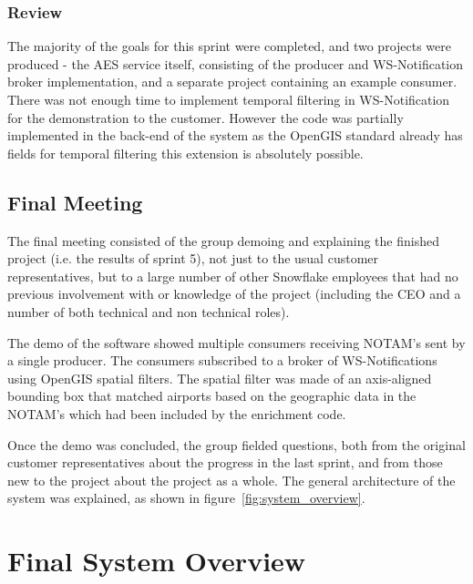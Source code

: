 \documentclass[a4paper, 12pt, twoside]{article}
\begin{document}
\subsubsection{Review}

The majority of the goals for this sprint were completed, and two projects were produced - the AES service itself, consisting of the producer and WS-Notification broker implementation, and a separate project containing an example consumer. There was not enough time to implement temporal filtering in WS-Notification for the demonstration to the customer. However the code was partially implemented in the back-end of the system as the OpenGIS standard already has fields for temporal filtering this extension is absolutely possible. 

\subsection{Final Meeting}
\label{sec:impl_final_meeting}

The final meeting consisted of the group demoing and explaining the finished project (i.e. the results of sprint 5), not just to the usual customer representatives, but to a large number of other Snowflake employees that had no previous involvement with or knowledge of the project (including the CEO and a number of both technical and non technical roles). 

The demo of the software showed multiple consumers receiving NOTAM's sent by a single producer. The consumers subscribed to a broker of WS-Notifications using OpenGIS spatial filters. The spatial filter was made of an axis-aligned bounding box that matched airports based on the geographic data in the NOTAM's which had been included by the enrichment code.

Once the demo was concluded, the group fielded questions, both from the original customer representatives about the progress in the last sprint, and from those new to the project about the project as a whole. The general architecture of the system was explained, as shown in figure~\ref{fig:system_overview}.

\section{Final System Overview}
\label{sec:final_system}
\end{document}
